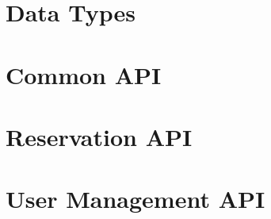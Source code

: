 \documentclass[a4paper]{report}
\newenvironment{Api}{\begin{itemize}}{\end{itemize}}
\newcommand{\ApiCode}[1]{\lstinline[style=styleApi]|#1|}
\newcommand{\ApiItem}[1]{\item #1 %

}
\newcommand{\ApiCmd}[1]{\ApiItem{\ApiCode{#1}}}
\newcommand{\ApiClass}[2]{\ApiItem{%
  \ifx&#2& \ApiCode{class #1} \else \ApiCode{class #1 extends #2} \fi}%
}
\newenvironment{ApiClassAttributes}{%

\begin{samepage}\textbf{Attributes:}\begin{compactitem}}{\end{compactitem}\end{samepage}}
\newcommand{\ApiRequired}{{\color{blue!50!black}\textbf{Required}}}
\newcommand{\ApiReadOnly}{{\color{red!50!black}\textbf{ReadOnly}}}
\newcommand{\ApiClassAttribute}[3]{\ApiItem{\ApiCode{#2} \ApiCode{#1} \hspace{1mm}(\ifx&#3&\ApiReadOnly\else#3\fi)
}}
\begin{document}
\section{Data Types}






\section{Common API}




\section{Reservation API}




\section{User Management API}
\end{document}
